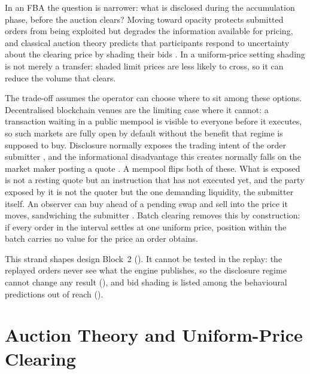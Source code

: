 In an FBA the question is narrower: what is disclosed during the
accumulation phase, before the auction clears? Moving toward opacity
protects submitted orders from being exploited but degrades the
information available for pricing, and classical auction theory predicts
that participants respond to uncertainty about the clearing price by
shading their bids \citep{klemperer1999auction}. In a uniform-price
setting shading is not merely a transfer: shaded limit prices are less
likely to cross, so it can reduce the volume that clears.

The trade-off assumes the operator can choose where to sit among these
options. Decentralised blockchain venues are the limiting case where it
cannot: a transaction waiting in a public mempool is visible to everyone
before it executes, so such markets are fully open by default without the
benefit that regime is supposed to buy. Disclosure normally exposes the trading intent of the order submitter
\citep{madhavan1996transparency}, and the informational disadvantage this
creates normally falls on the market maker posting a quote
\citep{glosten1985bid}. A mempool flips both of these. What is exposed is
not a resting quote but an instruction that has not executed yet, and the
party exposed by it is not the quoter but the one demanding liquidity,
the submitter itself. An observer can buy ahead of a pending swap and
sell into the price it moves, sandwiching the submitter
\citep{daian2020flash}. Batch
clearing removes this by construction: if every order in the interval
settles at one uniform price, position within the batch carries no value
for the price an order obtains.

This strand shapes design Block~2 (). It cannot be
tested in the replay: the replayed orders never see what the engine
publishes, so the disclosure regime cannot change any result
(), and bid shading is listed among the behavioural
predictions out of reach ().

\section{Auction Theory and Uniform-Price Clearing}
\label{sec:auctiontheory}

